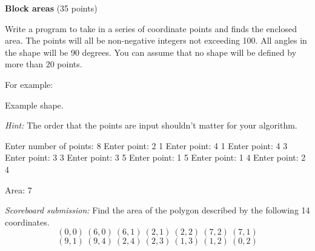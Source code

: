 \documentclass[11pt]{cselabheader}
\theoremstyle{plain}
\begin{document}
\begin{prob}[blocks.py]
    \textbf{Block areas} (35 points)


    Write a program to take in a series of coordinate points and finds the 
    enclosed area. The points will all be non-negative integers not 
    exceeding 100. All angles in the shape will be 90 degrees. You can 
    assume that no shape will be defined by more than 20 points. 

    For example:
    \begin{center}

      Example shape.
    \end{center}

    \emph{Hint:} The order that the points are input shouldn't matter
    for your algorithm.

    \begin{verbatimcode}
Enter number of points: 8
Enter point: 2 1
Enter point: 4 1
Enter point: 4 3
Enter point: 3 3
Enter point: 3 5
Enter point: 1 5
Enter point: 1 4
Enter point: 2 4

Area: 7
    \end{verbatimcode}

    \textit{Scoreboard submission:} Find the area of the polygon described
    by the following 14 coordinates.
    \[
      (0, 0)~(6, 0)~(6, 1)~(2, 1)~(2, 2)~(7, 2)~(7, 1)
    \]
    \[
      (9, 1)~(9, 4)~(2, 4)~(2, 3)~(1, 3)~(1, 2)~(0, 2)
    \]

    \begin{center}
\end{center}
\end{prob}
\end{document}
